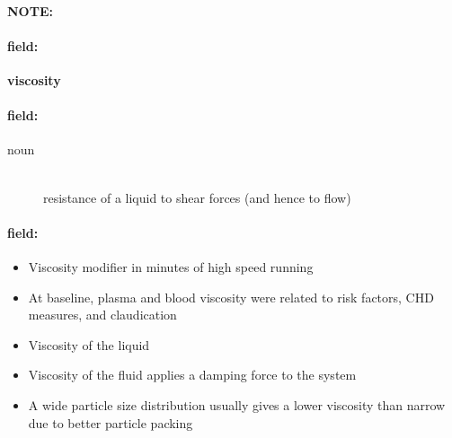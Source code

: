 \documentclass[12pt]{article}
\newenvironment{note}{\paragraph{NOTE:}}{}
\newenvironment{field}{\paragraph{field:}}{}
\begin{document}
\begin{note}
\begin{field}
\textbf{\large viscosity}
\end{field}


\begin{field}
\begin{description}
\item[noun] \hfill \\ 
resistance of a liquid to shear forces (and hence to flow)

\end{description}
\end{field}

\begin{field}
\begin{itemize}
\item Viscosity modifier in minutes of high speed running
\item At baseline, plasma and blood viscosity were related to risk factors, CHD measures, and claudication
\item Viscosity of the liquid
\item Viscosity of the fluid applies a damping force to the system
\item A wide particle size distribution usually gives a lower viscosity than narrow due to better particle packing
\end{itemize}
\end{field}
\end{note}
\end{document}
